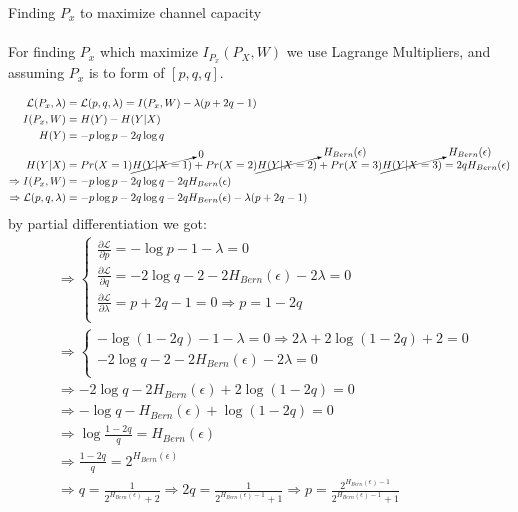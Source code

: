 \documentclass[
  course = {{EE623 Information Theory}},
  quartile = {{4}},
  assignment = 6,
  name = {{Mohammad Mahdi Rahimi}},
  studentnumber = {{20208244}},
  email = {{mahi@kaist.ac.kr}},
  firstexercise = 1
]{aga-homework}
\begin{document}
\exercise Finding $P_x$ to maximize channel capacity
\\\\
For finding $P_x$ which maximize $I_{P_x}(P_X, W)$ we use Lagrange Multipliers, and assuming $P_x$ is to form of $[p,q,q]$. 

\begin{equation} \label{eq3}
\begin{split}
\mathcal{L}(P_x, \lambda) & = \mathcal{L}(p, q, \lambda) = I(P_x, W) - \lambda(p + 2q - 1) \\
I(P_x, W) & = H(Y) - H(Y|X)\\
H(Y) & =  - p\log{p} - 2q\log{q}\\
H(Y|X) & =  Pr(X=1)\cancelto{0}{H(Y|X=1)}+Pr(X=2)\cancelto{H_{Bern}(\epsilon)}{H(Y|X=2)}+Pr(X=3)\cancelto{H_{Bern}(\epsilon)}{H(Y|X=3)} = 2qH_{Bern}(\epsilon)\\
\Rightarrow I(P_x, W) & = - p\log{p} - 2q\log{q} - 2qH_{Bern}(\epsilon)\\
\Rightarrow \mathcal{L}(p, q, \lambda) & =  - p\log{p} - 2q\log{q} - 2qH_{Bern}(\epsilon) - \lambda(p + 2q - 1)
\end{split}
\end{equation}
by partial differentiation we got:
\begin{equation} \label{eq3}
\begin{split}
& \Rightarrow \begin{cases}
\frac{\partial\mathcal{L}}{\partial p} = -\log{p} - 1 - \lambda = 0\\
\frac{\partial\mathcal{L}}{\partial q} = -2\log{q} - 2 - 2H_{Bern}(\epsilon) - 2\lambda = 0\\
\frac{\partial\mathcal{L}}{\partial \lambda} = p + 2q - 1 = 0 \Rightarrow p = 1 - 2q\\
\end{cases}\\
& \Rightarrow \begin{cases}
-\log{(1 -2q)} - 1 - \lambda = 0 \Rightarrow 2\lambda + 2\log{(1 -2q)} + 2 = 0\\
-2\log{q} - 2 - 2H_{Bern}(\epsilon) - 2\lambda = 0\\
\end{cases}\\
&\Rightarrow -2\log{q} - 2H_{Bern}(\epsilon) + 2\log{(1 -2q)} = 0\\
&\Rightarrow -\log{q} - H_{Bern}(\epsilon) + \log{(1 -2q)} = 0\\
&\Rightarrow \log{\frac{1 -2q}{q}} = H_{Bern}(\epsilon)\\
&\Rightarrow \frac{1 -2q}{q} = 2^{H_{Bern}(\epsilon)}\\
&\Rightarrow q = \frac{1}{2^{H_{Bern}(\epsilon)} + 2} \Rightarrow 2q = \frac{1}{2^{H_{Bern}(\epsilon) - 1} + 1} \Rightarrow p = \frac{2^{H_{Bern}(\epsilon) - 1}}{2^{H_{Bern}(\epsilon) - 1} + 1}\\
\end{split}
\end{equation}
\end{document}

